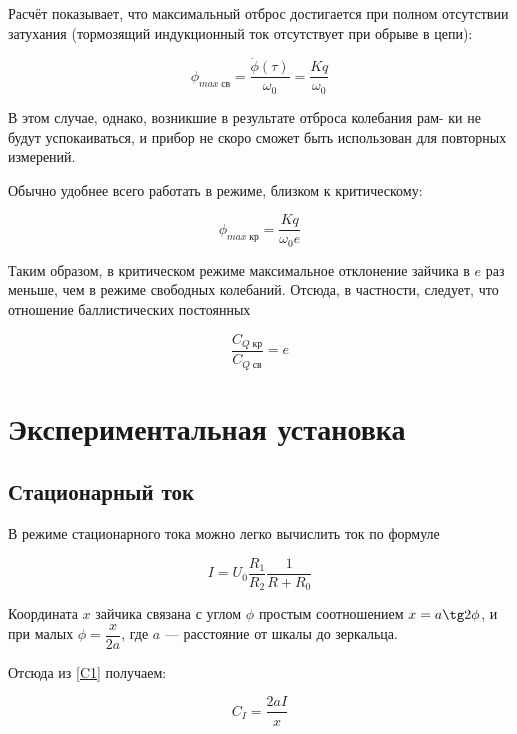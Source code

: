 \documentclass[a4paper,12pt]{article}
\begin{document}
Расчёт показывает, что максимальный отброс достигается при полном
отсутствии затухания (тормозящий индукционный ток отсутствует при
обрыве в цепи):

\begin{equation}\label{}
\phi_{max \; св} = \dfrac{\dot{\phi }(\tau) }{\omega_0} = \dfrac{Kq}{\omega_0}
\end{equation}

В этом случае, однако, возникшие в результате отброса колебания рам-
ки не будут успокаиваться, и прибор не скоро сможет быть использован
для повторных измерений.

Обычно удобнее всего работать в режиме, близком к критическому:

\begin{equation}\label{}
\phi_{max \; кр} = \dfrac{Kq}{\omega_0 e}
\end{equation}

Таким образом, в критическом режиме максимальное отклонение зайчика в $ e $ раз меньше, чем в режиме свободных колебаний. Отсюда, в частности,  следует, что отношение баллистических постоянных

\begin{equation}\label{}
\dfrac{C_{Q \; кр}}{C_{Q \; св}} = e
\end{equation}

\section{Экспериментальная установка}

\subsection{Стационарный ток}

В режиме стационарного тока можно легко вычислить ток по формуле 

\begin{equation}\label{I}
I = U_0 \dfrac{R_1}{R_2} \dfrac{1}{R + R_0}
\end{equation}

Координата $ x $ зайчика связана с углом $ \phi $ простым соотношением $ x = a\tg 2\phi $, и при малых $ \phi  =  \dfrac{x}{2a}$, где $ a $ --- расстояние от шкалы до зеркальца. 

Отсюда из \eqref{C1} получаем:

\begin{equation}\label{C1exp}
C_I = \dfrac{2aI}{x}
\end{equation}
\end{document}
